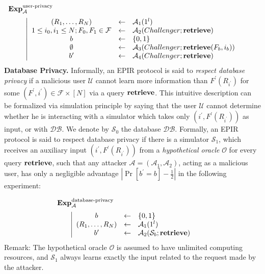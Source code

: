 \documentclass[JMC]{degruyter-journal}
\begin{document}
$\hspace{0.2cm}{\bf Exp}_{\mathcal{A}}^{\rm user\text{-}privacy} $
\vspace{-0.25cm}
$$
 \left| \begin{array}{ccl}
               (R_1,\ldots,R_N) &\leftarrow&\mathcal{A}_1(1^l)    \\
              1\leq i_0,i_1\leq N; F_0,F_1\in \mathcal{F}&\leftarrow& \mathcal{A}_2(Challenger;{\bf retrieve})      \\
              b&\leftarrow& \{0,1\}     \\
              \emptyset &\leftarrow& \mathcal{A}_3(Challenger; {\bf retrieve}(F_b,i_b))      \\
             b^{\prime} &\leftarrow& \mathcal{A}_4(Challenger;{\bf retrieve})      \\
\end{array}
\right.$$ {\bf Database Privacy.} Informally, an EPIR protocol is
said to {\em respect database privacy}
 if a malicious user $\mathcal{U}$ cannot learn more information than $F^{\prime}(R_{i^{\prime}})$ for
some $(F^{\prime}, i^{\prime})\in \mathcal{F} \times [N]$  via a
query ${\bf retrieve}$. This intuitive description  can be
formalized via simulation principle by saying that the user
$\mathcal{U}$ cannot determine whether he is interacting with a
simulator which takes  only $(i^{\prime},
F^{\prime}(R_{i^{\prime}}))$ as input, or with $\mathcal{DB}$. We
denote by $\mathcal{S}_0$ the database $\mathcal{DB}$. Formally, an
EPIR protocol is said to respect database privacy if there is a
simulator
 $\mathcal{S}_1$,  which receives  an
auxiliary input $(i^{\prime}, F^{\prime}(R_{i^{\prime}}))$ from a
{\em hypothetical oracle}
 $\mathcal{O}$ for every query
${\bf retrieve}$, such that any attacker $\mathcal{A} =
(\mathcal{A}_1,\mathcal{A}_2)$, acting as a malicious user, has only
a negligible advantage $|\Pr[b^{\prime}=b]-\frac{1}{2}|$ in the
following experiment:

$\hspace{2.6cm}{\bf Exp}_{\mathcal{A}}^{\rm database\text{-}privacy}
$ \vspace{-0.25cm}
$$
 \left| \begin{array}{ccl}
              b&\leftarrow& \{0,1\}     \\
               (R_1,\ldots,R_N) &\leftarrow&\mathcal{A}_1(1^l)    \\
             b^{\prime} &\leftarrow& \mathcal{A}_2(\mathcal{S}_b;{\bf retrieve})      \\
\end{array}
\right.$$ Remark: The hypothetical oracle $\mathcal{O}$ is assumed
to have unlimited computing resources, and
 $\mathcal{S}_1$ always learns exactly the input related
to the request made by the attacker.
\end{document}
